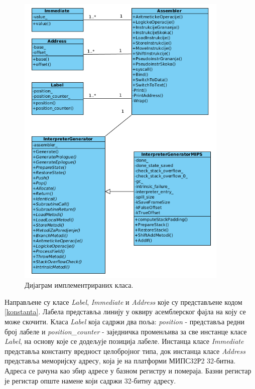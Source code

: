 \documentclass[12pt,oneside]{memoir}
\begin{document}
\begin{figure}[!ht]
  \centering
  \includegraphics[width=0.9\textwidth]{class_diagram.png}
  \caption{Дијаграм имплементрираних класа.}
  \label{fig:klase}
\end{figure}

Направљене су класе \textit{Label}, \textit{Immediate} и \textit{Address} које су представљене кодом \ref{konstanta}. Лабела представља линију у оквиру асемблерског фајла на коју се може скочити. Класа \textit{Label} која садржи два поља: \textit{position} - представља редни број лабеле и \textit{position\_counter} - заједничка променљива за све инстанце класе \textit{Label}, на основу које се додељује позиција лабеле. Инстанца класе \textit{Immediate} представља константу вредност целобројног типа, док инстанца класе \textit{Address} представља меморијску адресу, која је на платформи МИПС32Р2 32-битна. Адреса се рачуна као збир адресе у базном регистру и помераја. Базни регистар је регистар опште намене који садржи 32-битну адресу.\\
\end{document}
